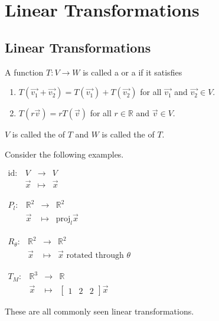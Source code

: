 \documentclass[11pt,fleqn]{book} %
\begin{document}
\chapter{Linear Transformations}

\section{Linear Transformations}

\begin{definition}
    A function $T: V \to W$ is called a  or a  if it satisfies
    
    \begin{enumerate}[label=\roman*)]
        \item $T(\overrightarrow{v_1} + \overrightarrow{v_2}) = T(\overrightarrow{v_1}) + T(\overrightarrow{v_2})$ for all $\overrightarrow{v_1}$ and $\overrightarrow{v_2} \in V$. 
        \item $T(r\overrightarrow{v}) = rT(\overrightarrow{v})$ for all $r \in \mathbb{R}$ and $\overrightarrow{v} \in V$. 
    \end{enumerate}
    
    $V$ is called the  of $T$ and $W$ is called the  of $T$.
\end{definition}

\begin{example} Consider the following examples. 

\begin{minipage}[t]{0.45\linewidth}
    $\begin{matrix} \mathrm{id}: &V &\to &V \\ &\overrightarrow{x} &\mapsto &\overrightarrow{x} \end{matrix}$
    
    $\begin{matrix} P_l: &\mathbb{R}^2 &\to &\mathbb{R}^2 \\ &\overrightarrow{x} &\mapsto &\mathrm{proj}_l\overrightarrow{x} \end{matrix}$
\end{minipage}
\begin{minipage}[t]{0.45\linewidth}
    $\begin{matrix} R_{\theta}: &\mathbb{R}^2 &\to &\mathbb{R}^2 \\ &\overrightarrow{x} &\mapsto &\overrightarrow{x}\text{ rotated through }\theta \end{matrix}$
    
    $\begin{matrix} T_M: &\mathbb{R}^3 &\to &\mathbb{R} \\ &\overrightarrow{x} &\mapsto &\begin{bmatrix} 1&2&2 \end{bmatrix}\overrightarrow{x} \end{matrix}$
\end{minipage}

These are all commonly seen linear transformations. 
\end{example}
\end{document}
